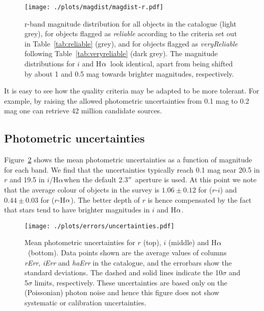 \documentclass[useAMS,usenatbib]{mn2e}
\def\ha{\mbox{H$\rm \alpha$}}
\def\arcsec{$''$}
\begin{document}
\begin{figure}
    \texttt{[image: ./plots/magdist/magdist-r.pdf]} 
    \caption{r-band magnitude distribution for all objects in the catalogue 
    (light grey), for objects flagged as \emph{reliable} 
    according to the criteria set out in Table~\ref{tab:reliable} (grey),
    and for objects flagged as \emph{veryReliable} 
    following Table~\ref{tab:veryreliable} (dark grey).
    The magnitude distributions for $i$ and \ha\
    look identical, apart from being shifted
    by about 1 and 0.5 mag towards brighter magnitudes,
    respectively.}
    \label{fig:magdist}
\end{figure}

It is easy to see how the quality criteria
may be adapted to be more tolerant.
For example, by raising the allowed photometric uncertainties
from 0.1 mag to 0.2 mag one can retrieve 42 million candidate sources.

\subsection{Photometric uncertainties}

Figure~\ref{fig:uncertainties} shows the mean photometric
uncertainties as a function of magnitude for each band.
We find that the uncertainties typically
reach 0.1 mag near 20.5 in $r$ 
and 19.5 in $i$/\ha when the default 2.3\arcsec\ aperture is used.
At this point we note that the average colour
of objects in the survey is
$1.06\pm0.12$ for ($r$-$i$) and $0.44\pm0.03$ for ($r$-\ha).
The better depth of $r$ is hence compensated
by the fact that stars tend to have 
brighter magnitudes in $i$ and \ha.

\begin{figure}
    \texttt{[image: ./plots/errors/uncertainties.pdf]} 
    \caption{Mean photometric uncertainties
             for $r$ (top), $i$ (middle) and \ha\ (bottom).
             Data points shown are the average values of
             columns \emph{rErr}, \emph{iErr} and \emph{haErr}
             in the catalogue, 
             and the errorbars show the standard deviations.
             The dashed and solid lines indicate 
             the 10$\sigma$ and 5$\sigma$ limits, respectively.
             These uncertainties are based only on the (Poissonian)
             photon noise and hence this figure does not show
             systematic or calibration uncertainties.}
    \label{fig:uncertainties}
\end{figure}
\end{document}
